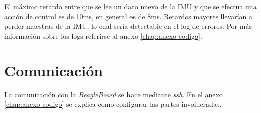 \documentclass[main]{subfiles}
\begin{document}
El m\'aximo retardo entre que se lee un dato nuevo de la IMU y que se efectua una acci\'on de control es de 10ms, en general es de 8ms. Retardos mayores llevar\'ian a perder muestras de la IMU, lo cual ser\'ia detectable en el log de errores. Por m\'as informaci\'on sobre los logs referirse al anexo \ref{chap:anexo-codigo}.

\section{Comunicaci\'on}
\label{sec:software-comm}

La comunicaci\'on con la \textit{BeagleBoard} se hace mediante \textit{ssh}. En el anexo \ref{chap:anexo-codigo} se explica como configurar las partes involucradas.
\end{document}

